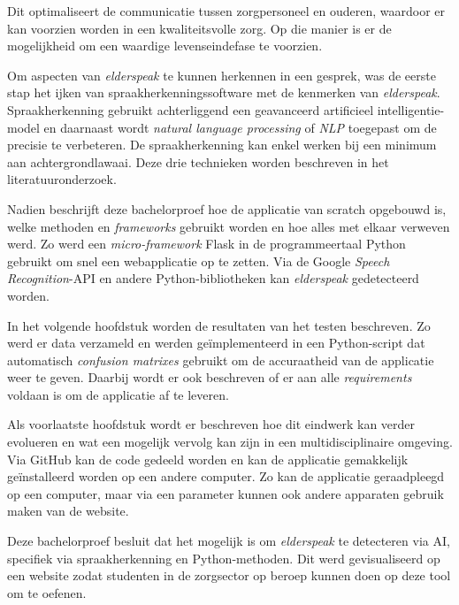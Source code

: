 Dit optimaliseert de communicatie tussen zorgpersoneel en ouderen, waardoor er kan voorzien worden in een kwaliteitsvolle zorg. Op die manier is er de mogelijkheid om een waardige levenseindefase te voorzien.

Om aspecten van \textit{elderspeak} te kunnen herkennen in een gesprek, was de eerste stap het ijken van spraakherkenningssoftware met de kenmerken van \textit{elderspeak}. Spraakherkenning gebruikt achterliggend een geavanceerd artificieel intelligentie-model en daarnaast wordt \textit{natural language processing} of \textit{NLP} toegepast om de precisie te verbeteren. De spraakherkenning kan enkel werken bij een minimum aan achtergrondlawaai. Deze drie technieken worden beschreven in het literatuuronderzoek.

Nadien beschrijft deze bachelorproef hoe de applicatie van scratch opgebouwd is, welke methoden en \textit{frameworks} gebruikt worden en hoe alles met elkaar verweven werd. Zo werd een \textit{micro-framework} Flask in de programmeertaal Python gebruikt om snel een webapplicatie op te zetten. Via de Google \textit{Speech Recognition}-API en andere Python-bibliotheken kan \textit{elderspeak} gedetecteerd worden.

In het volgende hoofdstuk worden de resultaten van het testen beschreven. Zo werd er data verzameld en werden geïmplementeerd in een Python-script dat automatisch \textit{confusion matrixes} gebruikt om de accuraatheid van de applicatie weer te geven. Daarbij wordt er ook beschreven of er aan alle \textit{requirements} voldaan is om de applicatie af te leveren.

Als voorlaatste hoofdstuk wordt er beschreven hoe dit eindwerk kan verder evolueren en wat een mogelijk vervolg kan zijn in een multidisciplinaire omgeving. Via GitHub kan de code gedeeld worden en kan de applicatie gemakkelijk geïnstalleerd worden op een andere computer. Zo kan de applicatie geraadpleegd op een computer, maar via een parameter kunnen ook andere apparaten gebruik maken van de website.

Deze bachelorproef besluit dat het mogelijk is om \textit{elderspeak} te detecteren via AI, specifiek via spraakherkenning en Python-methoden. Dit werd gevisualiseerd op een website zodat studenten in de zorgsector op beroep kunnen doen op deze tool om te oefenen.

